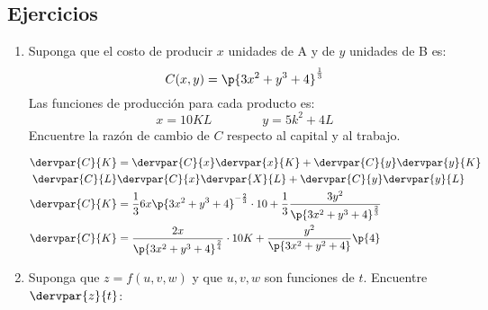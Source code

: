 \documentclass{article}
\begin{document}
\subsection{Ejercicios}
\begin{enumerate}
    \item Suponga que el costo de producir $x$ unidades de A y de $y$ unidades de B es:
        \[
          C(x,y) = \p{3x^2+y^3+4}^{\frac{1}{3} }
        \]
        Las funciones de producción para cada producto es:
        \[
          x = 10KL \qquad \qquad y = 5k^2+4L
        \]
        Encuentre la razón de cambio de $C$ respecto al capital y al trabajo.
        \begin{center}
           \begin{align*}
               \dervpar{C}{K} &= \dervpar{C}{x} \dervpar{x}{K} + \dervpar{C}{y}\dervpar{y}{K}  \\ 
               \dervpar{C}{L} & \dervpar{C}{x} \dervpar{X}{L} + \dervpar{C}{y} \dervpar{y}{L} \\ 
               \dervpar{C}{K} &= \frac{1}{3} 6x \p{3x^2+y^3+4}^{-\frac{2}{3}} \cdot 10 + \frac{1}{3} \frac{3y^2}{\p{3x^2+y^3+4}^\frac{2}{3}} \\ 
               \dervpar{C}{K} &= \frac{2x}{\p{3x^2+y^3+4}^{\frac{2}{4}}} \cdot 10K + \frac{y^2}{\p{3x^2+y^2+4}} \p{4} \\  
           \end{align*}
        \end{center}
    
    \item Suponga que $z=f(u,v,w)$ y que $u,v,w$ son funciones de $t$. Encuentre $\dervpar{z}{t}$:
\end{enumerate}
\end{document}
